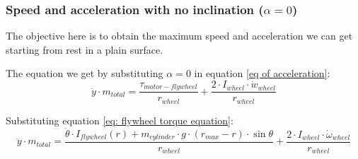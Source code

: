 \subsubsection{Speed and acceleration with no inclination ($\alpha = 0$)}
The objective here is to obtain the maximum speed and acceleration we can get starting from rest in a plain surface.

The equation we get by substituting $\alpha = 0$ in equation \ref{eq of acceleration}:
\[\ddot{y}\cdot m_{total} = \frac{\tau_{motor-flywheel}}{r_{wheel}} +\frac{2\cdot I_{wheel} \cdot  \dot{w}_{wheel}}{r_{wheel}}\]

Substituting equation \ref{eq: flywheel torque equation}:
\begin{equation}\label{eq: no inclintation}
    \ddot{y}\cdot m_{total} = \frac{\ddot{\theta}\cdot I_{flywheel}(r) +
    m_{cylinder} \cdot  g \cdot  (r_{max} - r) \cdot  \sin{\theta}}{r_{wheel}} +\frac{2\cdot I_{wheel} \cdot  \dot{\omega}_{wheel}}{r_{wheel}}
\end{equation}



